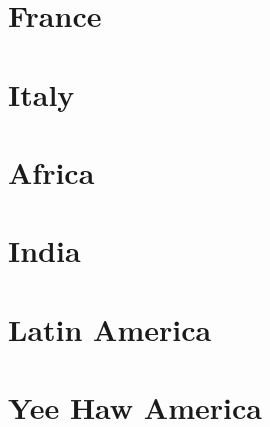 \documentclass[twosides, 11pt]{book}
\begin{document}
\chapter{France}

%
%

\chapter{Italy}
%
%
%

\chapter{Africa}
%

\chapter{India}
%

\chapter{Latin America}

%
%


%
%
%

\chapter{Yee Haw America}

%
%
%



\clearpage
\printindex
\end{document}
